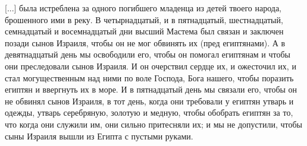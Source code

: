 [...] была истреблена за одного погибшего младенца
из детей твоего народа, брошенного ими в реку. В
четырнадцатый, и в пятнадцатый, шестнадцатый,
семнадцатый и восемнадцатый дни высший Мастема
был связан и заключен позади сынов Израиля, чтобы
он не мог обвинять их (пред египтянами). А в
девятнадцатый день мы освободили его, чтобы он
помогал египтянам и чтобы они преследовали сынов
Израиля. И он очерствил сердце их, и ожесточил их,
и стал могущественным над ними по воле Господа,
Бога нашего, чтобы поразить египтян и ввергнуть
их в море. И в пятнадцатый день мы связали его,
чтобы он не обвинял сынов Израиля, в тот день,
когда они требовали у египтян утварь и одежды,
утварь серебряную, золотую и медную, чтобы
обобрать египтян за то, что когда они служили им,
они сильно притесняли их; и мы не допустили, чтобы
сыны Израиля вышли из Египта с пустыми руками.

